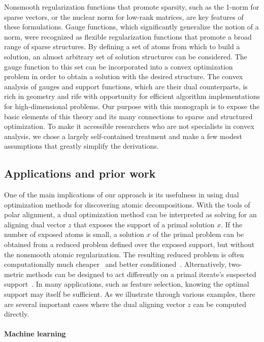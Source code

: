 Nonsmooth regularization functions that promote sparsity, such as the 1-norm for
sparse vectors, or the nuclear norm for low-rank matrices, are key features of
these formulations. Gauge functions, which significantly generalize the notion
of a norm, were recognized as flexible regularization functions that promote a
broad range of sparse structures. By defining a set of atoms from which to build
a solution, an almost arbitrary set of solution structures can be considered.
The gauge function to this set can be incorporated into a convex optimization
problem in order to obtain a solution with the desired structure. The convex
analysis of gauges and support functions, which are their dual counterparts, is
rich in geometry and rife with opportunity for efficient algorithm
implementations for high-dimensional problems. Our purpose with this monograph
is to expose the basic elements of this theory and its many connections to
sparse and structured optimization. To make it accessible researchers who are
not specialists in convex analysis, we chose a largely self-contained treatment
and make a few modest assumptions that greatly simplify the derivations.

\subsection{Applications and prior work}

One of the main implications of our approach is its usefulness in using dual
optimization methods for discovering atomic decompositions. With the tools of
polar alignment, a dual optimization method can be interpreted as solving for an
aligning dual vector $z$ that exposes the support of a primal solution $x$. If
the number of exposed atoms is small, a solution $x$ of the primal problem can
be obtained from a reduced problem defined over the exposed support, but without
the nonsmooth atomic regularization. The resulting reduced problem is often
computationally much cheaper~\citep{freund2017extended} and better
conditioned~\citep{negahban2012restricted}. Alternatively, two-metric methods can
be designed to act differently on a primal iterate's suspected
support~\citep{gafni1984two}. In many applications, such as feature selection,
knowing the optimal support may itself be sufficient.  As we illustrate through
various examples, there are several important cases where the dual aligning
vector $z$ can be computed directly.

\paragraph{Machine learning}

